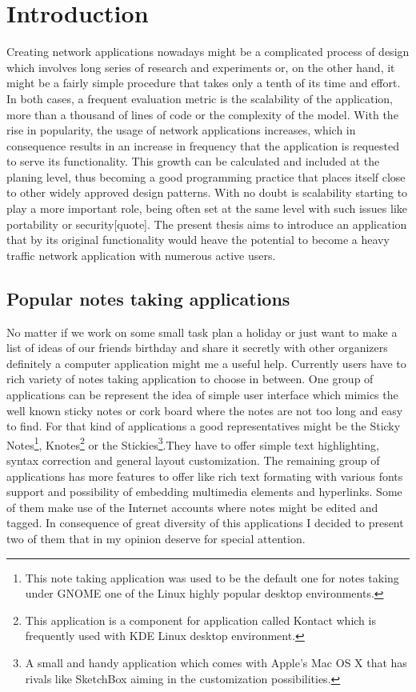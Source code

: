 \chapter{Introduction}
\label{sec:Introduction}
Creating network applications nowadays might be a complicated process of design which involves long series of research and experiments or, on the other hand, it might be a fairly simple procedure that takes only a tenth of its time and effort. In both cases, a frequent evaluation metric is the scalability of the application, more than a thousand of lines of code or the complexity of the model. With the rise in popularity, the usage of network applications increases, which in consequence results in an increase in frequency that the application is requested to serve its functionality. This growth can be calculated and included at the planing level, thus becoming a good programming practice that places itself close to other widely approved design patterns. With no doubt is scalability starting to play a more important role, being often set at the same level with such issues like portability or security[quote]. The present thesis aims to introduce an application that by its original functionality would heave the potential to become a heavy traffic network application with numerous active users.

\section{Popular notes taking applications}\label{sec:popular_apps} 
No matter if we work on some small task plan a holiday or just want to make a list of ideas of our friends birthday and share it secretly with other organizers definitely a computer application might me a useful help.     
Currently users have to rich variety of notes taking application to choose in between. One group of applications can be represent the idea of simple user interface which mimics the well known sticky notes or cork board where the notes are not too long and easy to find. For that kind of applications a good representatives might be the Sticky Notes\footnote{This note taking application was used to be the default one for notes taking under GNOME one of the Linux highly popular desktop environments.}, Knotes\footnote{This application is a component for application called Kontact which is frequently used with KDE Linux desktop environment.} or the Stickies\footnote{A small and handy application which comes with Apple's Mac OS X that has rivals like SketchBox aiming in the customization possibilities.}.They have to offer simple text highlighting, syntax correction and general layout customization. The remaining group of applications has more features to offer like rich text formating with various fonts support and possibility of embedding multimedia elements and hyperlinks. Some of them make use of the Internet accounts where notes might be edited and tagged. In consequence of great diversity of this applications I decided to  present two of them that in my opinion deserve for special attention.


